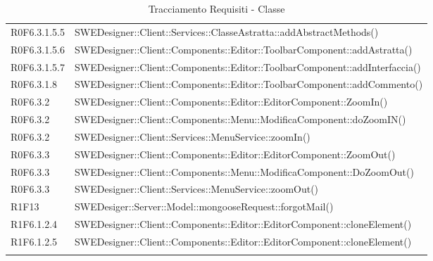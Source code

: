 \begin{center}
\begin{longtable}{p{2cm}!{\VRule[1pt]}p{13cm}}
R0F6.3.1.5.5 & SWEDesigner::Client::Services::ClasseAstratta::addAbstractMethods()\\
R0F6.3.1.5.6 & SWEDesigner::Client::Components::Editor::ToolbarComponent::addAstratta()\\
R0F6.3.1.5.7 & SWEDesigner::Client::Components::Editor::ToolbarComponent::addInterfaccia()\\
R0F6.3.1.8 & SWEDesigner::Client::Components::Editor::ToolbarComponent::addCommento()\\
R0F6.3.2 & SWEDesigner::Client::Components::Editor::EditorComponent::ZoomIn()\\
R0F6.3.2 & SWEDesigner::Client::Components::Menu::ModificaComponent::doZoomIN()\\
R0F6.3.2 & SWEDesigner::Client::Services::MenuService::zoomIn()\\
R0F6.3.3 & SWEDesigner::Client::Components::Editor::EditorComponent::ZoomOut()\\
R0F6.3.3 & SWEDesigner::Client::Components::Menu::ModificaComponent::DoZoomOut()\\
R0F6.3.3 & SWEDesigner::Client::Services::MenuService::zoomOut()\\
R1F13 & SWEDesiger::Server::Model::mongooseRequest::forgotMail()\\
R1F6.1.2.4 & SWEDesigner::Client::Components::Editor::EditorComponent::cloneElement()\\
R1F6.1.2.5 & SWEDesigner::Client::Components::Editor::EditorComponent::cloneElement()\\


\caption{Tracciamento Requisiti - Classe}
\end{longtable}
\end{center}